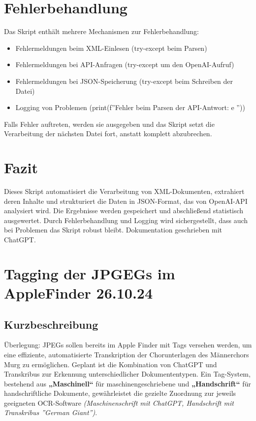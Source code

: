 \documentclass{article}
\begin{document}
\section{Fehlerbehandlung}
Das Skript enthält mehrere Mechanismen zur Fehlerbehandlung:
\begin{itemize}
\item Fehlermeldungen beim XML-Einlesen (try-except beim Parsen)
\item Fehlermeldungen bei API-Anfragen (try-except um den OpenAI-Aufruf)
\item Fehlermeldungen bei JSON-Speicherung (try-except beim Schreiben der Datei)
\item Logging von Problemen (print(f''Fehler beim Parsen der API-Antwort: {e} ''))
\end{itemize}

Falls Fehler auftreten, werden sie ausgegeben und das Skript setzt die Verarbeitung der nächsten Datei fort, anstatt komplett abzubrechen.

\section{Fazit}
Dieses Skript automatisiert die Verarbeitung von XML-Dokumenten, extrahiert deren Inhalte und strukturiert die Daten in JSON-Format, das von OpenAI-API analysiert wird. Die Ergebnisse werden gespeichert und abschließend statistisch ausgewertet. Durch Fehlerbehandlung und Logging wird sichergestellt, dass auch bei Problemen das Skript robust bleibt. Dokumentation geschrieben mit ChatGPT.

\noindent\hrulefill
\section{Tagging der JPGEGs im AppleFinder \small 26.10.24 } %

\subsection*{Kurzbeschreibung}

Überlegung:
JPEGs sollen bereits im Apple Finder mit Tags versehen werden, um eine effiziente, automatisierte Transkription der Chorunterlagen des Männerchors Murg zu ermöglichen. Geplant ist die Kombination von ChatGPT und Transkribus zur Erkennung unterschiedlicher Dokumententypen. Ein Tag-System, bestehend aus \textbf{„Maschinell“} für maschinengeschriebene und \textbf{„Handschrift“} für handschriftliche Dokumente, gewährleistet die gezielte Zuordnung zur jeweils geeigneten OCR-Software \textit{(Maschinenschrift mit ChatGPT, Handschrift mit Transkribus ''German Giant'')}.
\end{document}
